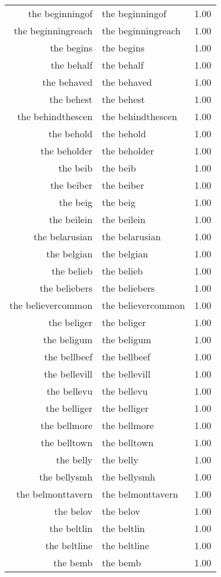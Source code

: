 \begin{table}[ht]
\begin{tabular}{rlr}
  the beginningof & the beginningof & 1.00 \\ 
  the beginningreach & the beginningreach & 1.00 \\ 
  the begins & the begins & 1.00 \\ 
  the behalf & the behalf & 1.00 \\ 
  the behaved & the behaved & 1.00 \\ 
  the behest & the behest & 1.00 \\ 
  the behindthescen & the behindthescen & 1.00 \\ 
  the behold & the behold & 1.00 \\ 
  the beholder & the beholder & 1.00 \\ 
  the beib & the beib & 1.00 \\ 
  the beiber & the beiber & 1.00 \\ 
  the beig & the beig & 1.00 \\ 
  the beilein & the beilein & 1.00 \\ 
  the belarusian & the belarusian & 1.00 \\ 
  the belgian & the belgian & 1.00 \\ 
  the belieb & the belieb & 1.00 \\ 
  the beliebers & the beliebers & 1.00 \\ 
  the believercommon & the believercommon & 1.00 \\ 
  the beliger & the beliger & 1.00 \\ 
  the beligum & the beligum & 1.00 \\ 
  the bellbeef & the bellbeef & 1.00 \\ 
  the bellevill & the bellevill & 1.00 \\ 
  the bellevu & the bellevu & 1.00 \\ 
  the belliger & the belliger & 1.00 \\ 
  the bellmore & the bellmore & 1.00 \\ 
  the belltown & the belltown & 1.00 \\ 
  the belly & the belly & 1.00 \\ 
  the bellysmh & the bellysmh & 1.00 \\ 
  the belmonttavern & the belmonttavern & 1.00 \\ 
  the belov & the belov & 1.00 \\ 
  the beltlin & the beltlin & 1.00 \\ 
  the beltline & the beltline & 1.00 \\ 
  the bemb & the bemb & 1.00 \\ 

\end{tabular}
\end{table}
